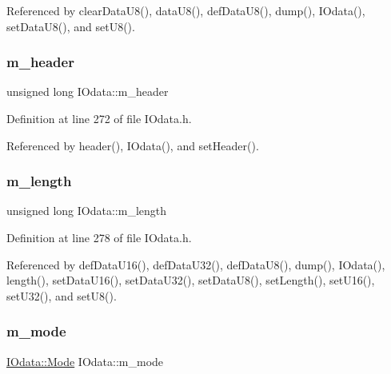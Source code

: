Referenced by clear\+Data\+U8(), data\+U8(), def\+Data\+U8(), dump(), I\+Odata(), set\+Data\+U8(), and set\+U8().

\mbox{\label{classIOdata_a46ec7dbfa257c02be1d39c4799f157d3}} 
\subsubsection{\texorpdfstring{m\+\_\+header}{m\_header}}
{\footnotesize\ttfamily unsigned long I\+Odata\+::m\+\_\+header\hspace{0.3cm}{\ttfamily [private]}}



Definition at line 272 of file I\+Odata.\+h.



Referenced by header(), I\+Odata(), and set\+Header().

\mbox{\label{classIOdata_afabe57441da019eb614d277799106aac}} 
\subsubsection{\texorpdfstring{m\+\_\+length}{m\_length}}
{\footnotesize\ttfamily unsigned long I\+Odata\+::m\+\_\+length\hspace{0.3cm}{\ttfamily [private]}}



Definition at line 278 of file I\+Odata.\+h.



Referenced by def\+Data\+U16(), def\+Data\+U32(), def\+Data\+U8(), dump(), I\+Odata(), length(), set\+Data\+U16(), set\+Data\+U32(), set\+Data\+U8(), set\+Length(), set\+U16(), set\+U32(), and set\+U8().

\mbox{\label{classIOdata_a0782e31763fa855f1ecbd377dce538e6}} 
\subsubsection{\texorpdfstring{m\+\_\+mode}{m\_mode}}
{\footnotesize\ttfamily \hyperlink{classIOdata_a044e9a4a0c6d25a43ebfe29c4fa4f1e5}{I\+Odata\+::\+Mode} I\+Odata\+::m\+\_\+mode\hspace{0.3cm}{\ttfamily [private]}}



